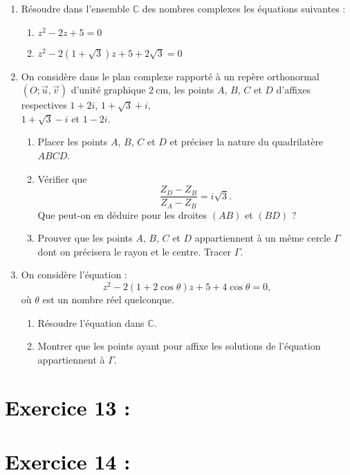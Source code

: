 \documentclass[12pt]{article}
\begin{document}
\begin{enumerate}
    \item Résoudre dans l’ensemble $\mathbb{C}$ des nombres complexes les équations suivantes :
    \begin{enumerate}
        \item $z^2 - 2z + 5 = 0$
        \item $z^2 - 2(1 + \sqrt{3})z + 5 + 2\sqrt{3} = 0$
    \end{enumerate}

    \item On considère dans le plan complexe rapporté à un repère orthonormal $(O; \vec{u}, \vec{v})$ d’unité graphique $2\ \text{cm}$, les points $A$, $B$, $C$ et $D$ d’affixes respectives $1 + 2i$, $1 + \sqrt{3} + i$,\\ $1 + \sqrt{3} - i$ et $1 - 2i$.
    \begin{enumerate}
        
        \item Placer les points $A$, $B$, $C$ et $D$ et préciser la nature du quadrilatère $ABCD$.

        \item Vérifier que 
        \[
        \frac{Z_D - Z_B}{Z_A - Z_B} = i\sqrt{3}.
        \]
        Que peut-on en déduire pour les droites $(AB)$ et $(BD)$ ?

        \item Prouver que les points $A$, $B$, $C$ et $D$ appartiennent à un même cercle $\Gamma$ dont on précisera le rayon et le centre. Tracer $\Gamma$.
    \end{enumerate}

    \item On considère l’équation :
    \[
    z^2 - 2(1 + 2\cos\theta)z + 5 + 4\cos\theta = 0,
    \]
    où $\theta$ est un nombre réel quelconque.
    \begin{enumerate}
        \item Résoudre l’équation dans $\mathbb{C}$.

        \item Montrer que les points ayant pour affixe les solutions de l’équation appartiennent à $\Gamma$.
    \end{enumerate}
\end{enumerate}

\section*{\textcolor{black}{Exercice 13 :}}
\section*{\textcolor{black}{Exercice 14 :}}
\end{document}
